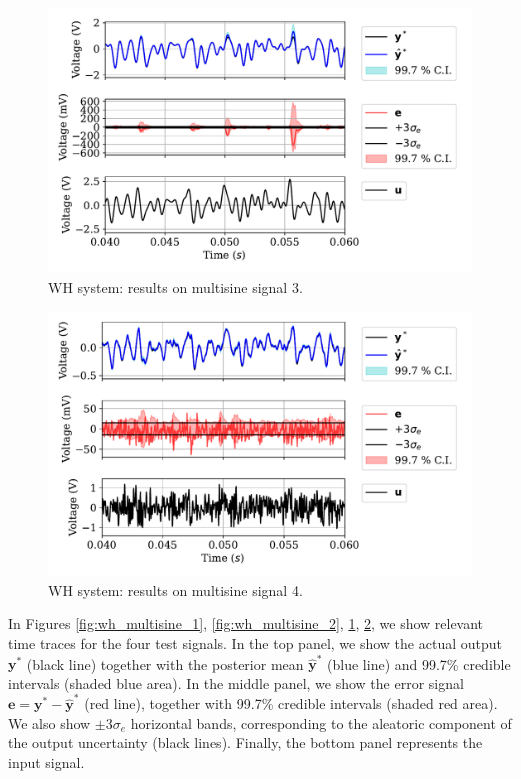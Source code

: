 \documentclass{article}
\newcommand{\tvec}[1]{{\mathbf{#1}}}
\newcommand{\mean}[1]{\hat{#1}}
\begin{document}
\begin{figure}%
 \centering
 \includegraphics[width=.99\linewidth]{img/MULTISINE_3.pdf}
 \caption{WH system: results on multisine signal 3.}
 \label{fig:wh_multisine_3}
\end{figure}

\begin{figure}%
 \centering
 \includegraphics[width=.99\linewidth]{img/MULTISINE_4.pdf}
 \caption{WH system: results on multisine signal 4.}
 \label{fig:wh_multisine_4}
\end{figure}

In Figures \ref{fig:wh_multisine_1}, \ref{fig:wh_multisine_2}, \ref{fig:wh_multisine_3}, \ref{fig:wh_multisine_4}, we show relevant time traces for the four test signals. In the top panel, we show the actual output $\tvec{y}^*$ (black line) together with the posterior mean $\mean{\tvec{y}}^*$ (blue line) and 99.7\% credible intervals (shaded blue area). In the middle panel, we show the error signal $\tvec{e}= \tvec{y}^*-\mean{\tvec{y}}^*$ (red line), together with 99.7\% credible intervals (shaded red area). We also show  $\pm 3 \sigma_e$ horizontal bands, corresponding to the aleatoric component of the output uncertainty  (black lines). Finally, the bottom panel represents the input signal. 
\end{document}
